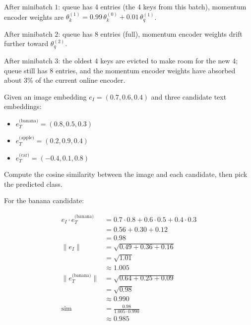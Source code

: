 After minibatch $1$: queue has 4 entries (the 4 keys from this batch), momentum encoder weights are $\theta_k^{(1)} = 0.99\,\theta_k^{(0)} + 0.01\,\theta_q^{(1)}$.

After minibatch $2$: queue has 8 entries (full), momentum encoder weights drift further toward $\theta_q^{(2)}$.

After minibatch $3$: the oldest 4 keys are evicted to make room for the new 4; queue still has 8 entries, and the momentum encoder weights have absorbed about $3\%$ of the current online encoder.


\vspace{2.5em}

Given an image embedding $e_I = (0.7, 0.6, 0.4)$ and three candidate text embeddings:

\begin{itemize}
    \item $e_T^{\text{(banana)}} = (0.8, 0.5, 0.3)$
    \item $e_T^{\text{(apple)}} = (0.2, 0.9, 0.4)$
    \item $e_T^{\text{(car)}} = (-0.4, 0.1, 0.8)$
\end{itemize}

Compute the cosine similarity between the image and each candidate, then pick the predicted class.

For the banana candidate:

\begin{align*}
    e_I \cdot e_T^{\text{(banana)}} &= 0.7 \cdot 0.8 + 0.6 \cdot 0.5 + 0.4 \cdot 0.3 \\
                                     &= 0.56 + 0.30 + 0.12 \\
                                     &= 0.98 \\[4pt]
    \|e_I\| &= \sqrt{0.49 + 0.36 + 0.16} \\
            &= \sqrt{1.01} \\
            &\approx 1.005 \\[4pt]
    \|e_T^{\text{(banana)}}\| &= \sqrt{0.64 + 0.25 + 0.09} \\
                              &= \sqrt{0.98} \\
                              &\approx 0.990 \\[4pt]
    \mathrm{sim} &= \frac{0.98}{1.005 \cdot 0.990} \\
                 &\approx 0.985
\end{align*}

